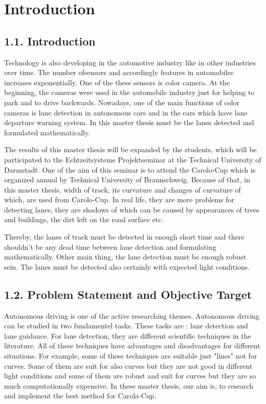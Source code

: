 
\chapter{Introduction}\label{cha:Intro}

\section*{1.1. Introduction}
\label{sec:Introduction}

Technology is also developing in the automotive industry like in other industries over
time. The number ofsensors and accordingly features in automobiles increases 
exponentially. One of the these sensors is color camera. At the beginning, the cameras
were used in the automobile industry just for helping to park and to drive backwards. 
Nowadays, one of the main functions of color cameras is lane detection in autonomous 
cars and in the cars which have lane departure warning system.
In this master thesis must be the lanes detected and formulated mathematically.

The results of this master thesis will be expanded by the students, which will be
participated to the Echtzeitsysteme Projektseminar at the Technical University of 
Darmstadt. One of the aim of this seminar is to attend the Carolo-Cup which is organized 
annual by Technical University of Braunschweig. Because of that, in this master thesis, 
width of track, its curvature and changes of curvature of which, are used from 
Carolo-Cup. In real life, they are more problems for detecting lanes, they are shadows 
of which can be caused by appearances of trees and buildings, the dirt left on the road 
surface etc.

Thereby, the lanes of track must be detected in enough short time and there shouldn't
be any dead time between lane detection and formulating mathematically. Other main thing,
the lane detection must be enough robust sein. The lanes must be detected also certainly 
with expected light conditions.

\section*{1.2. Problem Statement and Objective Target}
\label{sec:Problem Statement and Objective Target}

Autonomous driving is one of the active researching themes. Autonomous driving can be 
studied in two fundamentel tasks. These tasks are : lane detection and lane guidance. 
For lane detection, they are different scientific techniques in the literature. All of 
these techniques have advantages and disadvantages for different situations. For example,
some of these techniques are suitable just "lines"  not for curves. Some of them are 
suit for also curves but they are not good in different light conditions and some of them
are robust and suit for curves but they are so much computationally expensive. In these
master thesis, our aim is, to research and implement the best method for Carola-Cup.


